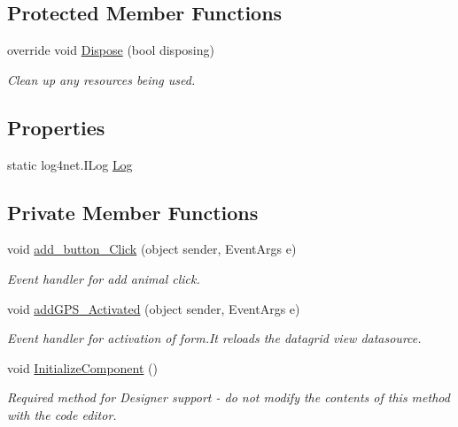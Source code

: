 \subsection*{Protected Member Functions}
\begin{DoxyCompactItemize}
\item 
override void \hyperlink{classWildlifeTrackingApp_1_1Add__GPS_a849c3c7f8d08104f0cdb46bee9fe6389}{Dispose} (bool disposing)
\begin{DoxyCompactList}\small\item\em Clean up any resources being used. \end{DoxyCompactList}\end{DoxyCompactItemize}
\subsection*{Properties}
\begin{DoxyCompactItemize}
\item 
static log4net.\+I\+Log \hyperlink{classWildlifeTrackingApp_1_1Add__GPS_a5fc9abb86e6110ecd61d0a1a7d740a8a}{Log}
\end{DoxyCompactItemize}
\subsection*{Private Member Functions}
\begin{DoxyCompactItemize}
\item 
void \hyperlink{classWildlifeTrackingApp_1_1Add__GPS_ae56b21bee08f5cad9858a264ccc21fd5}{add\+\_\+button\+\_\+\+Click} (object sender, Event\+Args e)
\begin{DoxyCompactList}\small\item\em Event handler for add animal click. \end{DoxyCompactList}\item 
void \hyperlink{classWildlifeTrackingApp_1_1Add__GPS_ad3c947935fcd0474a45348ac3a08fac4}{add\+G\+P\+S\+\_\+\+Activated} (object sender, Event\+Args e)
\begin{DoxyCompactList}\small\item\em Event handler for activation of form.\+It reloads the datagrid view datasource. \end{DoxyCompactList}\item 
void \hyperlink{classWildlifeTrackingApp_1_1Add__GPS_a6405d5db675d5338663195a4d12b4c9f}{Initialize\+Component} ()
\begin{DoxyCompactList}\small\item\em Required method for Designer support -\/ do not modify the contents of this method with the code editor. \end{DoxyCompactList}\end{DoxyCompactItemize}
